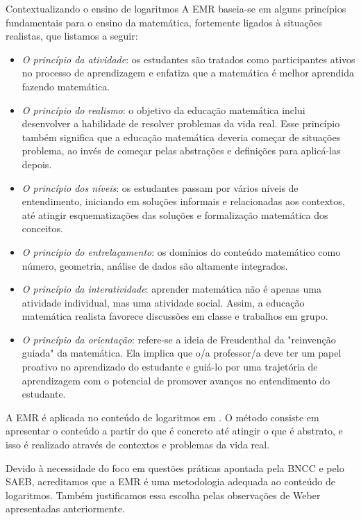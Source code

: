\begin{apresentacao}{Contextualizando o ensino de logaritmos}
A EMR baseia-se em alguns princípios fundamentais para o ensino da matemática, fortemente ligados à situações realistas, que listamos a seguir:
\begin{itemize}
\item \textit{O princípio da atividade}: os estudantes são tratados como participantes ativos no processo de aprendizagem e enfatiza que a matemática é melhor aprendida fazendo matemática.
\item \textit{O princípio do realismo}: o objetivo da educação matemática inclui desenvolver a habilidade de resolver problemas da vida real. Esse princípio também significa que a educação matemática deveria começar de situações problema, ao invés de começar pelas abstrações e definições para aplicá-las depois.
\item \textit{O princípio dos níveis}: os estudantes passam por vários níveis de entendimento, iniciando em soluções informais e relacionadas aos contextos, até atingir esquematizações das soluções e formalização matemática dos conceitos. 
\item \textit{O princípio do entrelaçamento}: os domínios do conteúdo matemático como número, geometria, análise de dados são altamente integrados.
\item \textit{O princípio da interatividade}: aprender matemática não é apenas uma atividade individual, mas uma atividade social. Assim, a educação matemática realista favorece discussões em classe e trabalhos em grupo.
\item \textit{O princípio da orientação}: refere-se a ideia de Freudenthal da "reinvenção guiada" da matemática. Ela implica que o/a professor/a deve ter um papel proativo no aprendizado do estudante e guiá-lo por uma trajetória de aprendizagem com o potencial de promover avanços no entendimento do estudante.
\end{itemize}


A EMR é aplicada no conteúdo de logaritmos em \cite{Webb2011}. O método consiste em apresentar o conteúdo a partir do que é concreto até atingir o que é abstrato, e isso é realizado através de contextos e problemas da vida real.

Devido à necessidade do foco em questões práticas apontada pela BNCC e pelo SAEB, acreditamos que a EMR é uma metodologia adequada ao conteúdo de logaritmos. Também justificamos essa escolha pelas observações de Weber apresentadas anteriormente.


\end{apresentacao}
